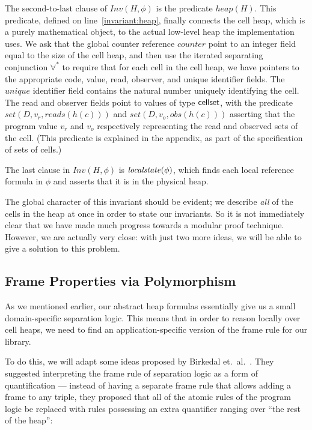 \documentclass[natbib]{sigplanconf}
\begin{document}
The second-to-last clause of $Inv(H, \phi)$ is the predicate $heap(H)$. This
predicate, defined on line~\ref{invariant:heap}, finally connects the
cell heap, which is a purely mathematical object, to the actual
low-level heap the implementation uses. We ask that the global counter
reference $counter$ point to an integer field equal to the size of the
cell heap, and then use the iterated separating conjunction
$\forall^*$ to require that for each cell in the cell heap, we have
pointers to the appropriate code, value, read, observer, and unique
identifier fields. The $unique$ identifier field contains the natural
number uniquely identifying the cell. The read and observer fields
point to values of type $\mbox{\textsf{{cellset}}}$, with the predicate $set(D, v_r,
reads(h(c)))$ and $set(D, v_o, obs(h(c)))$ asserting that the program
value $v_r$ and $v_o$ respectively representing the read and observed
sets of the cell. (This predicate is explained in the appendix, as part
of the specification of sets of cells.)

The last clause in $Inv(H,\phi)$ is $\mathit{localstate}(\phi)$, which 
finds each local reference formula in $\phi$ and asserts that it is in
the physical heap.

The global character of this invariant should be evident; we describe
\emph{all} of the cells in the heap at once in order to state our
invariants. So it is not immediately clear that we have made much
progress towards a modular proof technique. However, we are actually
very close: with just two more ideas, we will be able to give a
solution to this problem.

\subsection{Frame Properties via Polymorphism}

As we mentioned earlier, our abstract heap formulas essentially give
us a small domain-specific separation logic. This means that in order
to reason locally over cell heaps, we need to find an
application-specific version of the frame rule for our library. 

To do this, we will adapt some ideas proposed by
Birkedal et.\ al.~\cite{birkedal-torpsmith-yang-lics05}.
They suggested interpreting the frame rule of separation logic as a form of
quantification --- instead of having a separate frame rule that allows
adding a frame to any triple, they proposed that all of the atomic
rules of the program logic be replaced with rules possessing an extra
quantifier ranging over ``the rest of the heap'':
\end{document}
